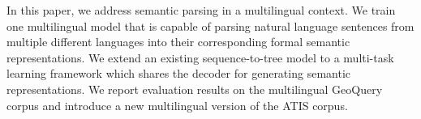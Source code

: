 In this paper, we address semantic parsing in a multilingual context. We train one multilingual model that is capable of parsing natural language sentences from multiple different languages into their corresponding formal semantic representations. We extend an existing sequence-to-tree model to a multi-task learning framework which shares the decoder for generating semantic representations. We report evaluation results on the multilingual GeoQuery corpus and introduce a new multilingual version of the ATIS corpus.
